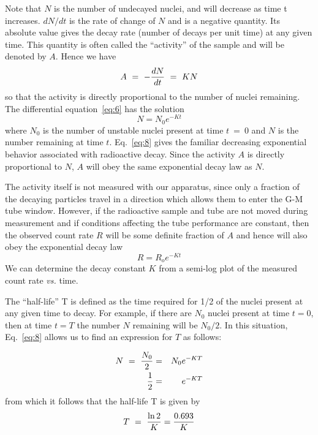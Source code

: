 \documentclass{article}
\begin{document}
Note that $N$ is the number of undecayed nuclei, and will decrease as time
t increases.  $dN/dt$ is the rate of change of $N$ and is a negative
quantity.  Its absolute value gives the decay rate (number of decays
per unit time) at any given time.  This quantity is often called the
``activity'' of the sample and will be denoted by $A$.  Hence we have
\begin{equation}
A ~=~ - { dN \over dt } ~=~ KN
\label{eq:7}
\end{equation}
so that the activity is directly proportional to the number of nuclei
remaining.  The differential equation~\ref{eq:6} has the solution
\begin{equation}
N = N_{0} e^{-Kt}
\label{eq:8}
\end{equation}
where $N_0$ is the number of unstable nuclei present at time $t~=~0$ and $N$ is
the number remaining at time $t$.  Eq.~\ref{eq:8} gives the familiar decreasing
exponential behavior associated with radioactive decay.  Since the
activity $A$ is directly proportional to $N$, $A$ will obey the same
exponential decay law as $N$.

The activity itself is not measured with our apparatus, since only a
fraction of the decaying particles travel in a direction which allows
them to enter the G-M tube window.  However, if the radioactive sample
and tube are not moved during measurement and if conditions affecting
the tube performance are constant, then the observed count rate $R$ will be some
definite fraction of $A$ and hence will also obey the exponential decay
law
\begin{equation}
R = R_{o} e^{-Kt}
\label{eq:9}
\end{equation}
We can determine the decay constant $K$ from a semi-log plot of the
measured count rate {\em vs.} time.

The ``half-life'' T is defined as the time
required for 1/2 of the nuclei present at any given time to decay.
For example, if there are $N_0$ nuclei present at time $t = 0$, then at
time $t = T$ the number $N$ remaining will be $N_0/2$.  In this situation,
Eq.~\ref{eq:8} allows us to find an expression for $T$ as follows:  

\begin{eqnarray}
N ~=~ {N_0 \over 2} &=& N_0 e^{-KT}\\
 {1 \over 2} &=& e^{-KT}
\end{eqnarray}
from which it follows that the half-life T is given by
\begin{equation}
T ~=~ {\ln{2} \over K} = {0.693 \over K}
\label{eq:11}
\end{equation}
\end{document}
